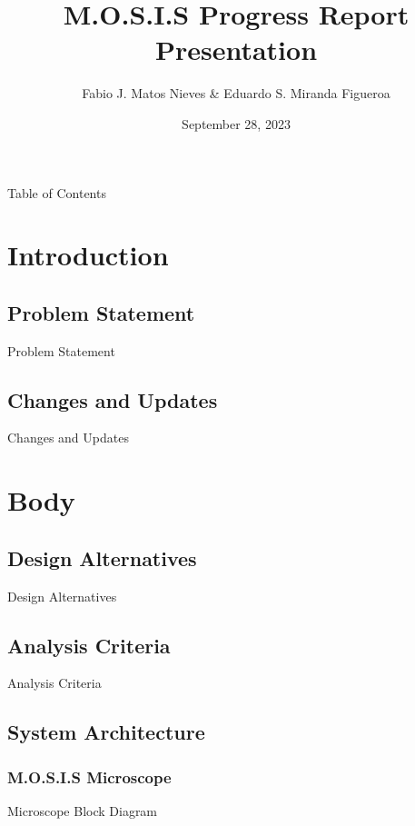 \documentclass[14pt, aspectratio=169]{beamer}
\title{M.O.S.I.S Progress Report Presentation}
\author{Fabio J. Matos Nieves \& Eduardo S. Miranda Figueroa }
\institute{University of Puerto Rico Mayagüez Campus}
\date{September 28, 2023}
\begin{document}
\begin{frame}
	\maketitle
\end{frame}
\begin{frame}{Table of Contents}
	\begin{multicols}{2}
		\tableofcontents
	\end{multicols}
\end{frame}
\section{Introduction}
\subsection{Problem Statement}
\begin{frame}{Problem Statement}

\end{frame}
\subsection{Changes and Updates}
\begin{frame}{Changes and Updates}

\end{frame}
\section{Body}
\subsection{Design Alternatives}
\begin{frame}{Design Alternatives}
\end{frame}
\subsection{Analysis Criteria}
\begin{frame}{Analysis Criteria}

\end{frame}
\subsection{System Architecture}
\subsubsection{M.O.S.I.S Microscope}
\begin{frame}{Microscope Block Diagram}

\end{frame}
\end{document}
